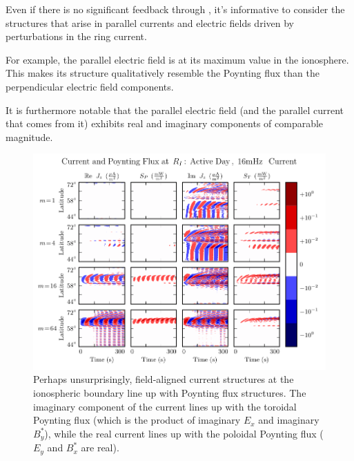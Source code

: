 Even if there is no significant feedback through \farlaw, it's informative to consider the structures that arise in parallel currents and electric fields driven by perturbations in the ring current. 

For example, the parallel electric field is at its maximum value in the ionosphere. This makes its structure qualitatively resemble the Poynting flux than the perpendicular electric field components. 

It is furthermore notable that the parallel electric field (and the parallel current that comes from it) exhibits real and imaginary components of comparable magnitude. 

\begin{figure}[!htb]
    \centering
    \includegraphics[width=\textwidth]{figures/current_poynting_flux.pdf}
    \caption[Current and Poynting Flux at the Ionosphere]{
      Perhaps unsurprisingly, field-aligned current structures at the ionospheric boundary line up with Poynting flux structures. The imaginary component of the current lines up with the toroidal Poynting flux (which is the product of imaginary $E_x$ and imaginary $B_y^*$), while the real current lines up with the poloidal Poynting flux ($E_y$ and $B_x^*$ are real).
    }
    \label{fig_current_poynting_flux}
\end{figure}


